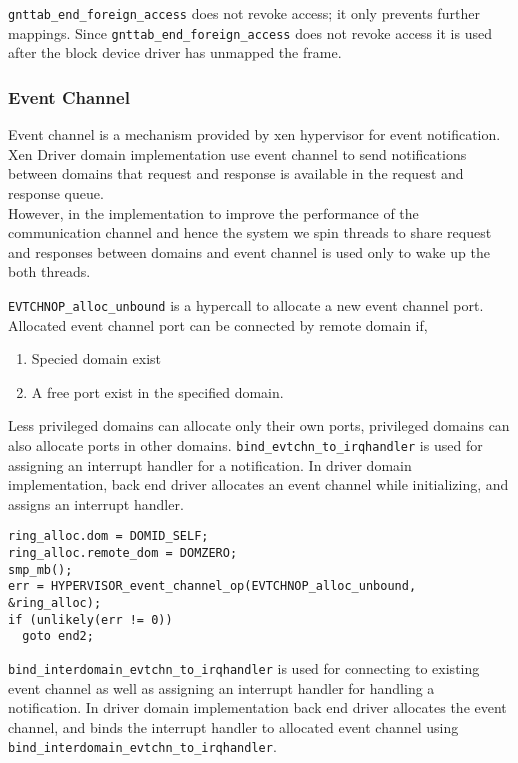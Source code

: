 \texttt{gnttab\_end\_foreign\_access} does not revoke access; it only prevents further mappings. Since \texttt{gnttab\_end\_foreign\_access} does not revoke access it is used after the block device driver has unmapped the frame\cite{Chisnall:2007:DGX:1407351, Barham:2003:XAV:945445.945462}.

\subsubsection*{Event Channel}
Event channel is a mechanism provided by xen hypervisor for event notification. Xen Driver domain implementation use event channel to send notifications between domains that request and response is available in the request and response queue.
\\
However, in the implementation to improve the performance of the communication channel and hence the system we spin threads to share request and responses between domains and event channel is used only to wake up the both threads.


\texttt{EVTCHNOP\_alloc\_unbound} is a hypercall to allocate a new event channel port. Allocated event channel port can be connected by remote domain if,
\begin{enumerate}
\item Specied domain exist
\item A free port exist in the specified domain.
\end{enumerate}
Less privileged domains can allocate only their own ports, privileged domains can also allocate ports in other domains\cite{Chisnall:2007:DGX:1407351, Barham:2003:XAV:945445.945462}. 
\texttt{bind\_evtchn\_to\_irqhandler} is used for assigning an interrupt handler for a notification.
In driver domain implementation, back end driver allocates an event channel while initializing, and assigns an interrupt handler. 
\begin{verbatim}
ring_alloc.dom = DOMID_SELF;
ring_alloc.remote_dom = DOMZERO;
smp_mb();
err = HYPERVISOR_event_channel_op(EVTCHNOP_alloc_unbound, &ring_alloc);
if (unlikely(err != 0))
  goto end2;
\end{verbatim}


\texttt{bind\_interdomain\_evtchn\_to\_irqhandler} is used for connecting to existing event channel as well as assigning an interrupt handler for handling a notification. In driver domain implementation back end driver allocates the event channel, and binds the interrupt handler to allocated event channel using \texttt{bind\_interdomain\_evtchn\_to\_irqhandler}.


